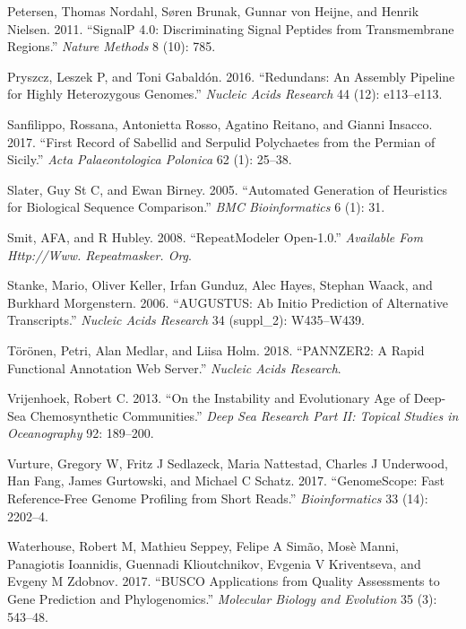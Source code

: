 \documentclass[]{article}
\begin{document}
\leavevmode\hypertarget{ref-petersen2011signalp}{}%
Petersen, Thomas Nordahl, Søren Brunak, Gunnar von Heijne, and Henrik
Nielsen. 2011. ``SignalP 4.0: Discriminating Signal Peptides from
Transmembrane Regions.'' \emph{Nature Methods} 8 (10): 785.

\leavevmode\hypertarget{ref-pryszcz2016redundans}{}%
Pryszcz, Leszek P, and Toni Gabaldón. 2016. ``Redundans: An Assembly
Pipeline for Highly Heterozygous Genomes.'' \emph{Nucleic Acids
Research} 44 (12): e113--e113.

\leavevmode\hypertarget{ref-sanfilippo2017first}{}%
Sanfilippo, Rossana, Antonietta Rosso, Agatino Reitano, and Gianni
Insacco. 2017. ``First Record of Sabellid and Serpulid Polychaetes from
the Permian of Sicily.'' \emph{Acta Palaeontologica Polonica} 62 (1):
25--38.

\leavevmode\hypertarget{ref-slater2005automated}{}%
Slater, Guy St C, and Ewan Birney. 2005. ``Automated Generation of
Heuristics for Biological Sequence Comparison.'' \emph{BMC
Bioinformatics} 6 (1): 31.

\leavevmode\hypertarget{ref-smit2008repeatmodeler}{}%
Smit, AFA, and R Hubley. 2008. ``RepeatModeler Open-1.0.''
\emph{Available Fom Http://Www. Repeatmasker. Org}.

\leavevmode\hypertarget{ref-stanke2006augustus}{}%
Stanke, Mario, Oliver Keller, Irfan Gunduz, Alec Hayes, Stephan Waack,
and Burkhard Morgenstern. 2006. ``AUGUSTUS: Ab Initio Prediction of
Alternative Transcripts.'' \emph{Nucleic Acids Research} 34 (suppl\_2):
W435--W439.

\leavevmode\hypertarget{ref-toronen2018pannzer2}{}%
Törönen, Petri, Alan Medlar, and Liisa Holm. 2018. ``PANNZER2: A Rapid
Functional Annotation Web Server.'' \emph{Nucleic Acids Research}.

\leavevmode\hypertarget{ref-vrijenhoek2013instability}{}%
Vrijenhoek, Robert C. 2013. ``On the Instability and Evolutionary Age of
Deep-Sea Chemosynthetic Communities.'' \emph{Deep Sea Research Part II:
Topical Studies in Oceanography} 92: 189--200.

\leavevmode\hypertarget{ref-vurture2017genomescope}{}%
Vurture, Gregory W, Fritz J Sedlazeck, Maria Nattestad, Charles J
Underwood, Han Fang, James Gurtowski, and Michael C Schatz. 2017.
``GenomeScope: Fast Reference-Free Genome Profiling from Short Reads.''
\emph{Bioinformatics} 33 (14): 2202--4.

\leavevmode\hypertarget{ref-waterhouse2017busco}{}%
Waterhouse, Robert M, Mathieu Seppey, Felipe A Simão, Mosè Manni,
Panagiotis Ioannidis, Guennadi Klioutchnikov, Evgenia V Kriventseva, and
Evgeny M Zdobnov. 2017. ``BUSCO Applications from Quality Assessments to
Gene Prediction and Phylogenomics.'' \emph{Molecular Biology and
Evolution} 35 (3): 543--48.
\end{document}
